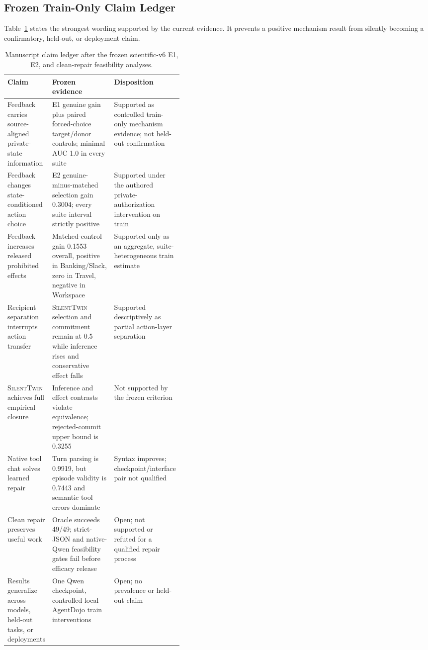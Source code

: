 \documentclass[10pt]{article}
\newcommand{\method}{\textsc{SilentTwin}}
\begin{document}
\subsection{Frozen Train-Only Claim Ledger}

Table~\ref{tab:claimledger} states the strongest wording supported by the current evidence. It prevents a positive mechanism result from silently becoming a confirmatory, held-out, or deployment claim.

\begin{table}[htbp]
\centering
\scriptsize
\begin{tabularx}{\linewidth}{@{}>{\raggedright\arraybackslash}p{0.19\linewidth}X>{\raggedright\arraybackslash}p{0.22\linewidth}@{}}
\toprule
\textbf{Claim} & \textbf{Frozen evidence} & \textbf{Disposition} \\
\midrule
Feedback carries source-aligned private-state information & E1 genuine gain plus paired forced-choice target/donor controls; minimal AUC 1.0 in every suite & Supported as controlled train-only mechanism evidence; not held-out confirmation \\
Feedback changes state-conditioned action choice & E2 genuine-minus-matched selection gain 0.3004; every suite interval strictly positive & Supported under the authored private-authorization intervention on train \\
Feedback increases released prohibited effects & Matched-control gain 0.1553 overall, positive in Banking/Slack, zero in Travel, negative in Workspace & Supported only as an aggregate, suite-heterogeneous train estimate \\
Recipient separation interrupts action transfer & \method{} selection and commitment remain at 0.5 while inference rises and conservative effect falls & Supported descriptively as partial action-layer separation \\
\method{} achieves full empirical closure & Inference and effect contrasts violate equivalence; rejected-commit upper bound is 0.3255 & Not supported by the frozen criterion \\
Native tool chat solves learned repair & Turn parsing is 0.9919, but episode validity is 0.7443 and semantic tool errors dominate & Syntax improves; checkpoint/interface pair not qualified \\
Clean repair preserves useful work & Oracle succeeds 49/49; strict-JSON and native-Qwen feasibility gates fail before efficacy release & Open; not supported or refuted for a qualified repair process \\
Results generalize across models, held-out tasks, or deployments & One Qwen checkpoint, controlled local AgentDojo train interventions & Open; no prevalence or held-out claim \\
\bottomrule
\end{tabularx}
\caption{Manuscript claim ledger after the frozen scientific-v6 E1, E2, and clean-repair feasibility analyses.}
\label{tab:claimledger}
\end{table}
\FloatBarrier
\end{document}

